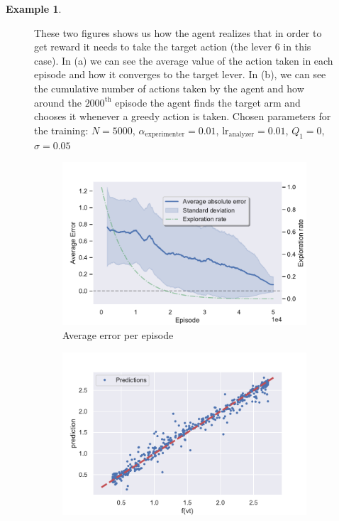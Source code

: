 \documentclass[11pt,a4paper,twoside]{report}
\newcommand{\+}{\textnormal{+} }
\theoremstyle{definition}
\newtheorem{myex}[mythm]{Example}
\numberwithin{equation}{chapter}
\begin{document}
\begin{myex}
\begin{figure}[]
{      These two figures shows us how the agent realizes that in order to get
      reward it needs to take the target action (the lever 6 in this case). In
      (a) we can see the average value of the action taken in each episode and
      how it converges to the target lever. In (b), we can see the cumulative
      number of actions taken by the agent and how around the $2000^\text{th}$
      episode the agent finds the target arm and chooses it whenever a greedy
      action is taken. Chosen parameters for the training: $N=5000$,
      $\alpha_\text{experimenter}=0.01$, $\text{lr}_\text{analyzer}=0.01$,
      $Q_1=0$, $\sigma=0.05$}
    \end{figure}

  

    \begin{figure}[]
      \centering
      \begin{subfigure}{.5\textwidth}
        \centering
        \includegraphics[width=1\linewidth]{figures/Error-MAB2.pdf}
        \caption{Average error per episode}
        \label{fig:ErrorAverageMAB2}
      \end{subfigure}%
      \begin{subfigure}{.5\textwidth}
        \centering
        \includegraphics[width=1\linewidth]{figures/predictions-MAB2.pdf}

\end{subfigure}
\end{figure}
\end{myex}
\end{document}
